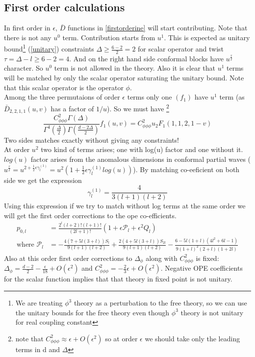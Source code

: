             \subsection{First order calculations}
                In first order in $\epsilon$, $\bar{D}$ functions in \ref{firstorderine} will start contributing. Note that there is not any $u^0$ term. Contribution starts from $u^1$. This is expected as unitary bound\footnote{We are treating $\phi^3$ theory as a perturbation to the free theory, so we can use the unitary bounds for the free theory even though $\phi^3$ theory is not unitary for real coupling constant} (\ref{unitary}) constraints $\Delta\geq\frac{6-2}{2}=2$ for scalar operator and twist $\tau = \Delta-l\geq6-2=4$. And on the right hand side conformal blocks have $u^{\frac{\tau}{2}}$ character. So $u^0$ term is not allowed in the theory. Also it is clear that $u^1$ terms will be matched by only the scalar operator saturating the unitary bound. Note that this scalar operator is the operator $\phi$.\\
                Among the three permutaions of order $\epsilon$ terms only one $(f_1)$ have $u^1$ term (as $\bar{D}_{2,2,1,1}(u,v)$ has a factor of $1/u$). So we must have \footnote{note that $C_{\phi\phi\phi}^2\approx\epsilon+O(\epsilon^2)$ so at order $\epsilon$ we should take only the leading terms in d and $\Delta$}
                \begin{equation}
                    \frac{C_{\phi\phi\phi}^{2}\Gamma(\Delta)}{\Gamma^{4}(\frac{\Delta}{2})\Gamma(\frac{d-2\Delta}{2})}f_1(u,v) = C_{\phi\phi\phi}^2u{}_2F_1\left(1,1,2,1-v \right)
                \end{equation}
                Two sides matches exactly without giving any constraints!\\
                At order $u^2$ two kind of terms arises; one with log(u) factor and one without it. $log(u)$ factor arises from the anomalous dimensions in conformal partial waves ($u^{\frac{\tau}{2}} = u^{2+\frac{1}{2}\epsilon \gamma_l^{(1)}} = u^2(1+\frac{1}{2}\epsilon\gamma_l^{(1)}log(u))$). By matching co-eeficient on both side we get the expression 
                \begin{equation}
                    \gamma_l^{(1)} = \frac{4}{3(l+1)(l+2)}
                \end{equation} 
                Using this expression if we try to match without log terms at the same order we will get the first order corrections to the ope co-efficients.
                \begin{align}
                    p_{0,l} &= \frac{2^l (l+2)!(l+1)! }{(2l+1)!}(1+\epsilon\mathcal{P}_l + \epsilon^2Q_l)\nonumber\\
                    \text{where } \mathcal{P}_l &= -\frac{4(7+5l(3+l))S_l}{9(l+1)(l+2)} + \frac{2(4+5l(3+l))S_{2l}}{9(l+1)(l+2)}-\frac{6-5l(1+l)(4l^2+6l-1)}{9(1+l)^2(2+l)(1+2l)}
                \end{align}
                Also at this order first order corrections to $\Delta_{\phi}$ along with $C_{\phi\phi\phi}^2$ is fixed: $\Delta_{\phi} = \frac{d-2}{2}-\frac{\epsilon}{18}+O(\epsilon^2)$ and $C_{\phi\phi\phi}^2 = -\frac{2}{3}\epsilon + O(\epsilon^2)$. Negative OPE coefficients for the scalar function implies that that theory in fixed point is not unitary.
